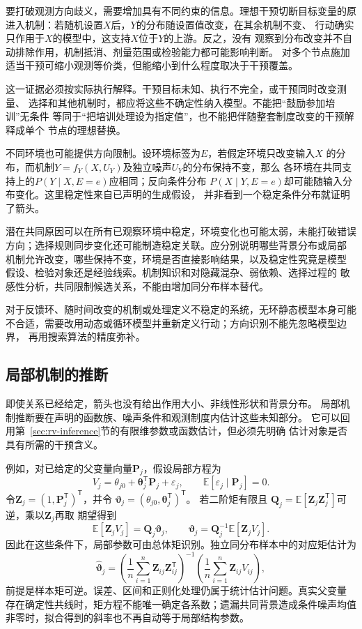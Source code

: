 要打破观测方向歧义，需要增加具有不同约束的信息。理想干预切断目标变量的原
进入机制：若随机设置\(X\)后，\(Y\)的分布随设置值改变，在其余机制不变、
行动确实只作用于\(X\)的模型中，这支持\(X\)位于\(Y\)的上游。反之，没有
观察到分布改变并不自动排除作用，机制抵消、剂量范围或检验能力都可能影响判断。
对多个节点施加适当干预可缩小观测等价类，但能缩小到什么程度取决于干预覆盖。

这一证据必须按实际执行解释。干预目标未知、执行不完全，或干预同时改变测量、
选择和其他机制时，都应将这些不确定性纳入模型。不能把“鼓励参加培训”无条件
等同于“把培训处理设为指定值”，也不能把伴随整套制度改变的干预解释成单个
节点的理想替换。

不同环境也可能提供方向限制。设环境标签为\(E\)，若假定环境只改变输入\(X\)
的分布，而机制\(Y=f_Y(X,U_Y)\)及独立噪声\(U_Y\)的分布保持不变，那么
各环境在共同支持上的\(P(Y\mid X,E=e)\)应相同；反向条件分布
\(P(X\mid Y,E=e)\)却可能随输入分布变化。这里稳定性来自已声明的生成假设，
并非看到一个稳定条件分布就证明了箭头。

潜在共同原因可以在所有已观察环境中稳定，环境变化也可能太弱，未能打破错误
方向；选择规则同步变化还可能制造稳定关联。应分别说明哪些背景分布或局部
机制允许改变，哪些保持不变，环境是否直接影响结果，以及稳定性究竟是模型
假设、检验对象还是经验线索。机制知识和对隐藏混杂、弱依赖、选择过程的
敏感性分析，共同限制候选关系，不能由增加同分布样本替代。

对于反馈环、随时间改变的机制或处理定义不稳定的系统，无环静态模型本身可能
不合适，需要改用动态或循环模型并重新定义行动；方向识别不能先忽略模型边界，
再用搜索算法的精度弥补。

\subsection{局部机制的推断}
\label{sec:causal-local-mechanism-inference}

即使关系已经给定，箭头也没有给出作用大小、非线性形状和背景分布。
局部机制推断要在声明的函数族、噪声条件和观测制度内估计这些未知部分。
它可以回用第~\ref{sec:rv-inference}节的有限维参数或函数估计，但必须先明确
估计对象是否具有所需的干预含义。

例如，对已给定的父变量向量\(\bm P_j\)，假设局部方程为
\[
  V_j=\theta_{j0}+\bm\theta_j^{\mathsf T}\bm P_j+\varepsilon_j,
  \qquad
  \mathbb E[\varepsilon_j\mid\bm P_j]=0.
\]
令\(\bm Z_j=(1,\bm P_j^{\mathsf T})^{\mathsf T}\)，并令
\(\bm\vartheta_j=(\theta_{j0},\bm\theta_j^{\mathsf T})^{\mathsf T}\)。
若二阶矩有限且
\(\bm Q_j=\mathbb E[\bm Z_j\bm Z_j^{\mathsf T}]\)可逆，乘以\(\bm Z_j\)再取
期望得到
\[
  \mathbb E[\bm Z_jV_j]=\bm Q_j\bm\vartheta_j,\qquad
  \bm\vartheta_j
  =\bm Q_j^{-1}\mathbb E[\bm Z_jV_j].
\]
因此在这些条件下，局部参数可由总体矩识别。独立同分布样本中的对应矩估计为
\[
  \widehat{\bm\vartheta}_j
  =
  \left(\frac1n\sum_{i=1}^n\bm Z_{ij}\bm Z_{ij}^{\mathsf T}\right)^{-1}
  \left(\frac1n\sum_{i=1}^n\bm Z_{ij}V_{ij}\right),
\]
前提是样本矩可逆。误差、区间和正则化处理仍属于统计估计问题。真实父变量
存在确定性共线时，矩方程不能唯一确定各系数；遗漏共同背景造成条件噪声均值
非零时，拟合得到的斜率也不再自动等于局部结构参数。

